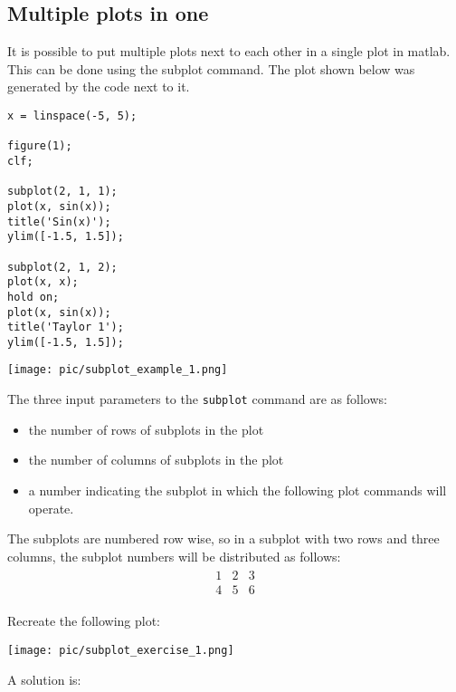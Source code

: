\pagebreak[4]
\subsection{Multiple plots in one}

It is possible to put multiple plots 
next to each other in a single plot in matlab.
This can be done using the subplot command.
The plot shown below
was generated by the code next to it.
\begin{multicols}{2}
\begin{lstlisting}
x = linspace(-5, 5);

figure(1);
clf;

subplot(2, 1, 1);
plot(x, sin(x));
title('Sin(x)');
ylim([-1.5, 1.5]);

subplot(2, 1, 2);
plot(x, x);
hold on;
plot(x, sin(x));
title('Taylor 1');
ylim([-1.5, 1.5]);
\end{lstlisting}
\columnbreak
\texttt{[image: pic/subplot\_example\_1.png]}
\end{multicols}

The three input parameters to the \verb!subplot! command
are as follows: 
\begin{itemize}
\item		the number of rows of subplots in the plot
\item		the number of columns of subplots in the plot
\item		a number indicating the subplot in which the following plot commands will operate.
\end{itemize}
The subplots are numbered row wise, so in a subplot 
with two rows and three columns, the subplot numbers will be
distributed as follows:
\begin{align*}
\begin{matrix}
1 & 2 & 3 \\
4 & 5 & 6
\end{matrix}
\end{align*}




\begin{ex}
Recreate the following plot: 
\begin{center}
\texttt{[image: pic/subplot\_exercise\_1.png]}
\end{center}
\begin{hint}
\end{hint}
\begin{sol}
A solution is:
\begin{lstlisting}
\end{lstlisting}
\end{sol}
\end{ex}
 